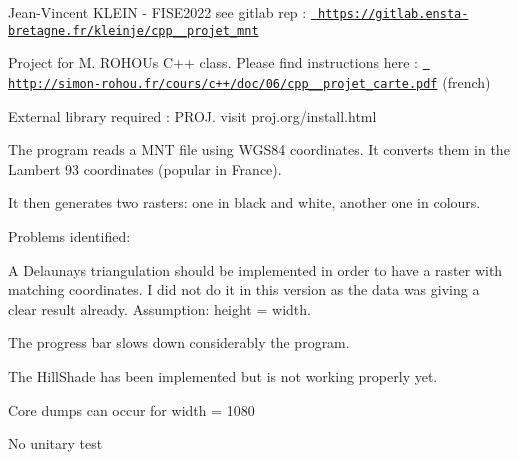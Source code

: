 \label{index_md__home_jvk_Bureau_cpp__projet_mnt_README}%
%
 Jean-\/\+Vincent KLEIN -\/ FISE2022 see gitlab rep \+: \href{https://gitlab.ensta-bretagne.fr/kleinje/cpp__projet_mnt}{\texttt{ https\+://gitlab.\+ensta-\/bretagne.\+fr/kleinje/cpp\+\_\+\+\_\+projet\+\_\+mnt}}

Project for M. ROHOU\textquotesingle{}s C++ class. Please find instructions here \+: \href{http://simon-rohou.fr/cours/c++/doc/06/cpp_06_projet_carte.pdf}{\texttt{ http\+://simon-\/rohou.\+fr/cours/c++/doc/06/cpp\+\_\+\_\+projet\+\_\+carte.\+pdf}} (french)

External library required \+: PROJ. visit proj.\+org/install.html

The program reads a MNT file using WGS84 coordinates. It converts them in the Lambert 93 coordinates (popular in France).

It then generates two rasters\+: one in black and white, another one in colours.

Problems identified\+:
\begin{DoxyItemize}
\item A Delaunay\textquotesingle{}s triangulation should be implemented in order to have a raster with matching coordinates. I did not do it in this version as the data was giving a clear result already. Assumption\+: height = width.
\item The progress bar slows down considerably the program.
\item The Hill\+Shade has been implemented but is not working properly yet.
\item Core dumps can occur for width = 1080
\item No unitary test 
\end{DoxyItemize}